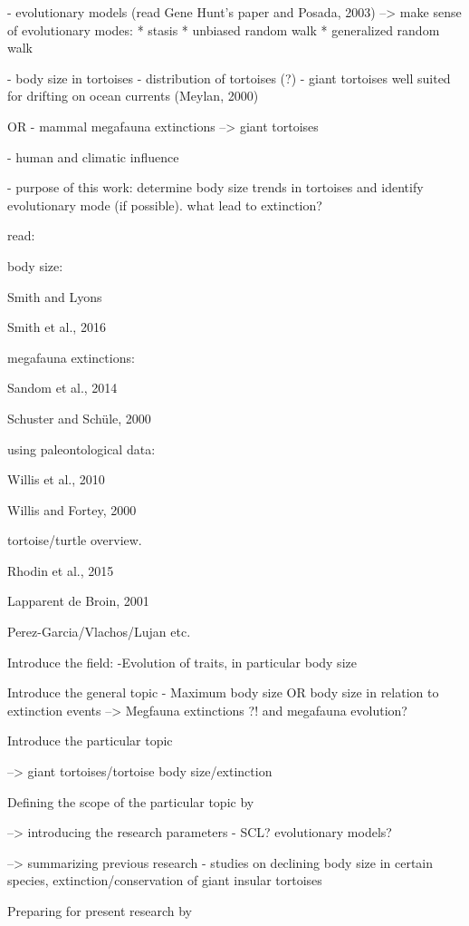 - evolutionary models (read Gene Hunt's paper and Posada, 2003)
-->  make sense of evolutionary modes:
* stasis
* unbiased random walk
* generalized random walk


- body size in tortoises %
- distribution of tortoises (?)
- giant tortoises well suited for drifting on ocean currents (Meylan, 2000)

OR
- mammal megafauna extinctions --> giant tortoises

- human and climatic influence

- purpose of this work: determine body size trends in tortoises and identify evolutionary mode (if possible). what lead to extinction?




read:

body size:

Smith and Lyons

Smith et al., 2016

megafauna extinctions:

Sandom et al., 2014

Schuster and Schüle, 2000

using paleontological data:

Willis et al., 2010

Willis and Fortey, 2000

tortoise/turtle overview.

Rhodin et al., 2015

Lapparent de Broin, 2001

Perez-Garcia/Vlachos/Lujan etc.


Introduce the field:
-Evolution of traits, in particular body size

Introduce the general topic
- Maximum body size OR body size in relation to extinction events
--> Megfauna extinctions ?! and megafauna evolution?

Introduce the particular topic

--> giant tortoises/tortoise body size/extinction

Defining the scope of the particular topic by

--> introducing the research parameters
- SCL? evolutionary models?

--> summarizing previous research
- studies on declining body size in certain species, extinction/conservation of giant insular tortoises

Preparing for present research by

